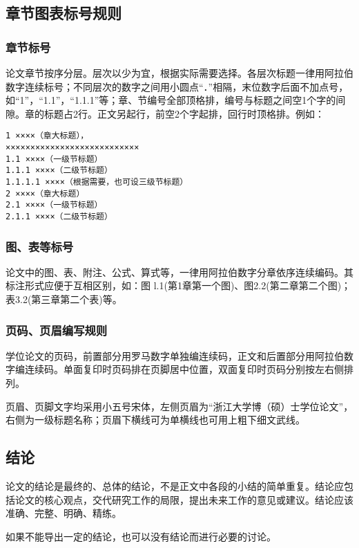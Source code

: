 \subsection{章节图表标号规则} %
\label{sub:章节图表标号规则}
\subsubsection{章节标号} %
\label{ssub:章节标号}
论文章节按序分层。层次以少为宜，根据实际需要选择。各层次标题一律用阿拉伯数字连续标号；不同层次的数字之间用小圆点“．”相隔，末位数字后面不加点号，如“1”，“1.1”，“1.1.1”等；章、节编号全部顶格排，编号与标题之间空1个字的间隙。章的标题占2行。正文另起行，前空2个字起排，回行时顶格排。例如：
\begin{verbatim}
1 ××××（章大标题），
×××××××××××××××××××××××××××
1.1 ××××（一级节标题）
1.1.1 ××××（二级节标题）
1.1.1.1 ××××（根据需要，也可设三级节标题）
2 ××××（章大标题）
2.1 ××××（一级节标题）
2.1.1 ××××（二级节标题）
\end{verbatim}
\subsubsection{图、表等标号} %
\label{ssub:图_表等标号}
论文中的图、表、附注、公式、算式等，一律用阿拉伯数字分章依序连续编码。其标注形式应便于互相区别，如：图 l.1(第1章第一个图)、图2.2(第二章第二个图)；表3.2(第三章第二个表)等。
\subsubsection{页码、页眉编写规则} %
\label{ssub:页码_页眉编写规则}
学位论文的页码，前置部分用罗马数字单独编连续码，正文和后置部分用阿拉伯数字编连续码。单面复印时页码排在页脚居中位置，双面复印时页码分别按左右侧排列。

页眉、页脚文字均采用小五号宋体，左侧页眉为“浙江大学博（硕）士学位论文”，右侧为一级标题名称；页眉下横线可为单横线也可用上粗下细文武线。
\subsection{结论} %
\label{sub:结论}
论文的结论是最终的、总体的结论，不是正文中各段的小结的简单重复。结论应包括论文的核心观点，交代研究工作的局限，提出未来工作的意见或建议。结论应该准确、完整、明确、精练。

如果不能导出一定的结论，也可以没有结论而进行必要的讨论。
